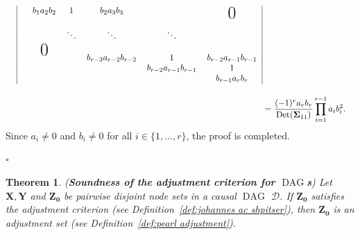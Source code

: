 \documentclass[11pt,a4paper]{article}
\newcommand\bigzero{\makebox(0,0){\text{\huge0}}}
\newtheorem{theorem}[definition]{Theorem}
\newenvironment{proofof}[1][]{\begin{trivlist}
   \item[\hskip \labelsep {\bfseries Proof of #1.}]}{\hfill{}$\square$\end{trivlist}}
\DeclareMathOperator{\Det}{Det}
\DeclareMathOperator{\DAG}{DAG}
\newcommand{\g}[1][G]{\mathcal{#1}}
\begin{document}
\begin{proofof}[Theorem~\ref{theorem:completeness ac}]
\begin{enumerate}[label=(\roman*)]
{\begin{align*}
\begin{blockarray}{ccccccc}
\begin{block}{c|cccccc|}
		&     			& b_1a_2b_2	&   1  			&   b_2a_3b_3			& 			 			&  \bigzero	 				\\
		&  			 	&   		&   		   	&   					&  						&  							\\
      	&  			 	&   		&  \ddots   	&    \ddots 			&  	\ddots				&  							\\
      	&   			&  \bigzero	&   		   	&   					&  						&  							\\
 		&   			& 		  	&  		 		& b_{r-3}a_{r-2}b_{r-2}	& 1						& b_{r-2}a_{r-1}b_{r-1} 	\\
		&    		 	& 		  	&  		 		&  			  			& b_{r-2}a_{r-1}b_{r-1}	& 1							\\
   		&   			&        	& 				&  		      			& 						& b_{r-1}a_{r}b_r 					\\
\end{block}
\end{blockarray} \\
&= \frac{(-1)^{r}a_{r}b_{r}}{\Det(\mathbf{\Sigma}_{11})}\prod_{i=1}^{r-1}a_{i}b_{i}^2.
\end{align*}
Since $a_i \neq 0$ and $b_i \neq 0$ for all $i \in \{1,\dots,r\}$, the proof is completed.}
\end{enumerate}

\end{proofof}

\begin{theorem} {(\textbf{Soundness of the adjustment criterion for $\DAG$s})}
Let $\mathbf{X,Y}$ and $\mathbf{Z_0}$ be pairwise disjoint node sets in a causal $\DAG$ $\g[D]$. If $\mathbf{Z_0}$ satisfies the adjustment criterion (see Definition~\ref{def:johannes ac shpitser}), then $\mathbf{Z_0}$ is an adjustment set (see Definition~\ref{def:pearl adjustment}).
\label{theorem:soundness ac}
\end{theorem}
\end{document}
